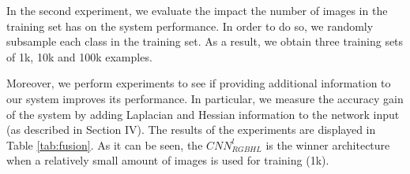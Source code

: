 \documentclass[review,12pt,3p]{elsarticle}
\begin{document}
\begin{table}[!ht]
\centering
{}
\caption{Confusion matrix for our method $CNN_{RGB}$. The numbers represent percentages.}
\label{tab:resCNN}
\end{table}

In the second experiment, we evaluate the impact the number of images in the training set has on the system performance. In order to do so, we randomly subsample each class in the training set. As a result, we obtain three training sets of 1k, 10k and 100k examples. 

Moreover, we perform experiments to see if providing additional information to our system improves its performance. In particular, we measure the accuracy gain of the system by adding Laplacian and Hessian information to the network input (as described in Section IV). The results of the experiments are displayed in Table \ref{tab:fusion}. As it can be seen, the $CNN^l_{RGBHL}$ is the winner architecture when a relatively small amount of images is used for training (1k).
\end{document}
